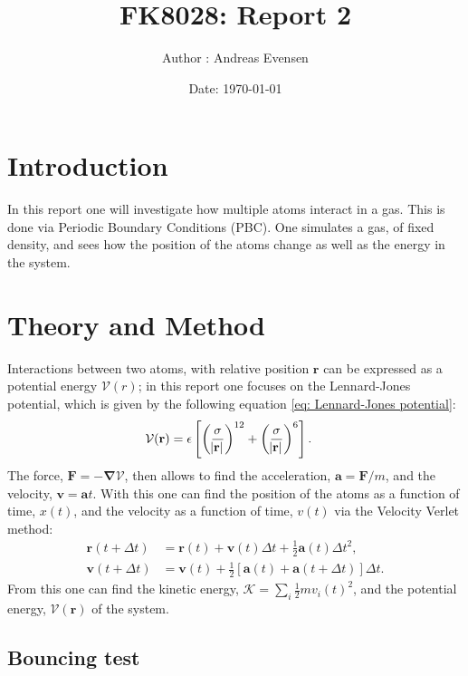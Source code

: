 \documentclass[a4paper]{article}
\title{FK8028: Report 2}
\author{Author : Andreas Evensen}
\date{Date: \today}
\newcommand{\grad}{\mathbf{\nabla}}
\newcommand{\newparagraph}{\vspace{.5cm}\noindent}
\begin{document}
\maketitle

\section{Introduction}
In this report one will investigate how multiple atoms interact in a gas. This is done via Periodic Boundary Conditions (PBC).
One simulates a gas, of fixed density, and sees how the position of the atoms change as well as the energy in the system.

\newparagraph


\section{Theory and Method}
Interactions between two atoms, with relative position $\mathbf{r}$ can be expressed as a potential energy $\mathcal{V}(r)$; in this report one focuses on the Lennard-Jones potential, which is given by the following equation \eqref{eq: Lennard-Jones potential}:
\begin{align}
    \mathcal{V}(\mathbf{r}) &= \epsilon\left[\left(\frac{\sigma}{\abs{\mathbf{r}}}\right)^{12} + \left(\frac{\sigma}{\abs{\mathbf{r}}}\right)^6\right].\label{eq: Lennard-Jones potential}
\end{align}The force, $\mathbf{F} = -\grad \mathcal{V}$, then allows to find the acceleration, $\mathbf{a} = \mathbf{F}/m$, and the velocity, $\mathbf{v} = \mathbf{a}t$.
With this one can find the position of the atoms as a function of time, $x(t)$, and the velocity as a function of time, $v(t)$ via the Velocity Verlet method:
\begin{align*}
    \mathbf{r}(t + \Delta t) &= \mathbf{r}(t) + \mathbf{v}(t)\Delta t + \frac{1}{2}\mathbf{a}(t)\Delta t^2,\\
    \mathbf{v}(t + \Delta t) &= \mathbf{v}(t) + \frac{1}{2}\left[\mathbf{a}(t) + \mathbf{a}(t + \Delta t)\right]\Delta t.
\end{align*}From this one can find the kinetic energy, $\mathcal{K} = \sum_i \frac{1}{2}mv_i(t)^2$, and the potential energy, $\mathcal{V}(\mathbf{r})$ of the system. 



\subsection{Bouncing test}
\end{document}
